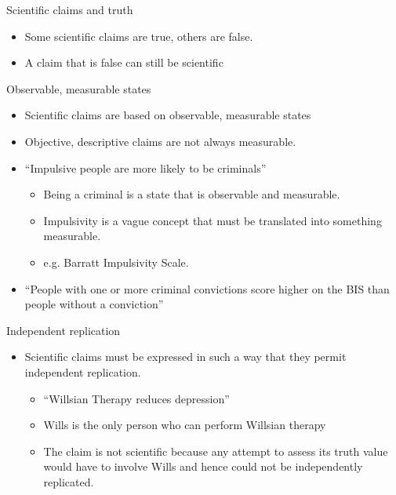 \documentclass{beamer}
\begin{document}
\begin{frame}{Scientific claims and truth}
	\begin{itemize}
		\item Some scientific claims are true, others are false.
		\item A claim that is false can still be scientific
	\end{itemize}
\end{frame}

\begin{frame}{Observable, measurable states}
	\begin{itemize}
		\item Scientific claims are based on observable, measurable states
		\item Objective, descriptive claims are not always measurable.
		\item ``Impulsive people are more likely to be criminals''
		\begin{itemize}
			\item Being a criminal is a state that is observable and measurable.
			\item Impulsivity is a vague concept that must be translated into something measurable.
			\item e.g. Barratt Impulsivity Scale.
		\end{itemize}
		\item ``People with one or more criminal convictions score higher on the BIS than people without a conviction''
	\end{itemize}
\end{frame}

\begin{frame}{Independent replication}
	\begin{itemize}
		\item Scientific claims must be expressed in such a way that they permit independent replication.
		\begin{itemize}
			\item ``Willsian Therapy reduces depression''
			\item Wills is the only person who can perform Willsian therapy
			\item The claim is not scientific because any attempt to assess its truth value would have to involve Wills and hence could not be independently replicated.
		\end{itemize}
	\end{itemize}
\end{frame}
\end{document}
